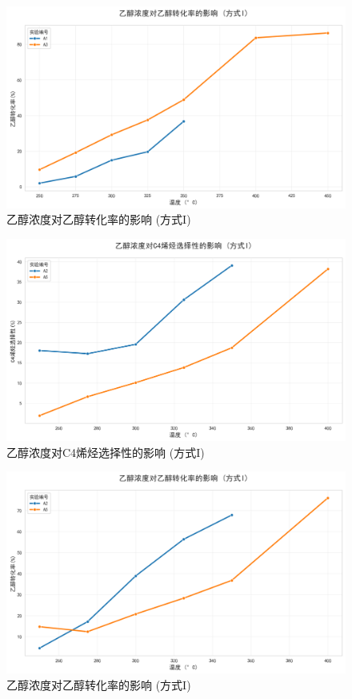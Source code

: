 \begin{figure}[h]%
	\centering%
	\includegraphics [scale=0.6]{图/2-2-1-2.png}
	\caption{乙醇浓度对乙醇转化率的影响 (方式I)} 
	\label{fig:1}
\end{figure}

\begin{figure}[h]%
	\centering%
	\includegraphics [scale=0.6]{图/2-2-2-1.png}
	\caption{乙醇浓度对C4烯烃选择性的影响 (方式I)} 
	\label{fig:1}
\end{figure}

\begin{figure}[h]%
	\centering%
	\includegraphics [scale=0.6]{图/2-2-2-2.png}
	\caption{乙醇浓度对乙醇转化率的影响 (方式I)} 
	\label{fig:1}
\end{figure}

